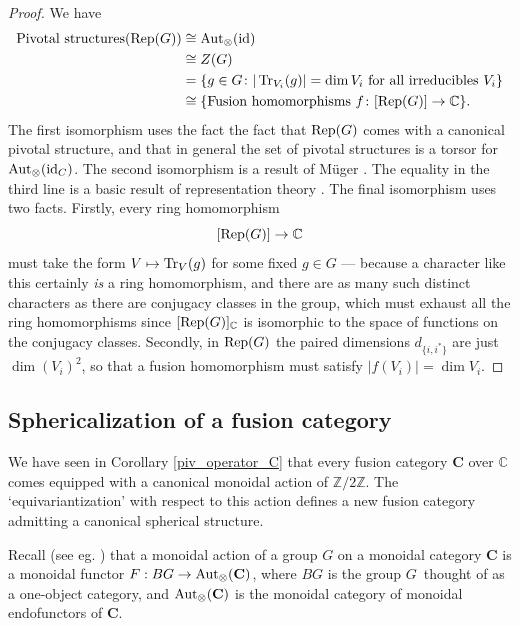 \documentclass[a4paper]{article}
\theoremstyle{plain}
\theoremstyle{definition}
\newcommand\id{\operatorname{\text{\rm id}}}
\newcommand{\Tr}{\operatorname{\text{\rm Tr}}}
\newcommand{\Rep}{\operatorname{\text{\rm Rep}}}
\newcommand{\Aut}{\operatorname{\text{\rm Aut}}}
\newcommand{\cat}{\mathbf}
\begin{document}
\begin{proof} We have
 \begin{align*}
  \text{Pivotal structures}(\Rep(G)) & \cong \Aut_\otimes(\id) \\
   & \cong Z(G) \\
   & = \{ g \in G \colon |\Tr_{V_i} (g) | = \dim V_i \text{ for all
irreducibles $V_i$}\} \\
   & \cong \{\text{Fusion homomorphisms } f \colon [\Rep(G)] \rightarrow
\mathbb{C} \}.
  \end{align*}
The first isomorphism uses the fact the fact that $\Rep(G)$ comes with a canonical pivotal structure, and that in general the set of pivotal structures is a torsor for $\Aut_\otimes (\id_C)$. The second isomorphism is a result
of M\"{u}ger \cite{muger2004center}. The equality in the third
line is a basic result of representation theory \cite[Cor 2.28]{isaacs1976-character}. The final isomorphism uses two facts. Firstly,
every ring homomorphism
 \[
  [\Rep(G)] \rightarrow \mathbb{C}
 \]
must take the form $V \mapsto \Tr_V(g)$ for some fixed $g \in G$ ---
because a character like this certainly {\em is} a ring homomorphism,
and there are as many such distinct characters as there are conjugacy
classes in the group, which must exhaust all the ring homomorphisms
since $[\Rep(G)]_\mathbb{C}$ is isomorphic to the space of functions
on the conjugacy classes. Secondly, in $\Rep(G)$ the paired dimensions
$d_{\{i,i^*\}}$ are just $\dim(V_i)^2$, so that a fusion homomorphism
must satisfy $| f(V_i) | = \dim V_i$.
\end{proof}


\subsection{Sphericalization of a fusion category}
We have seen in Corollary \ref{piv_operator_C}  that every fusion category $\cat{C}$ over $\mathbb{C}$ comes equipped with a canonical monoidal action of $\mathbb{Z} / 2 \mathbb{Z}$. The `equivariantization' with respect to this action defines a new fusion category admitting a canonical spherical structure. 

Recall (see eg. \cite{nikshych2008non}) that a monoidal action of a group $G$ on a monoidal category $\cat{C}$ is a monoidal functor $F : BG \rightarrow  \Aut_\otimes(\cat{C})$, where $BG$ is the group $G$\ thought of as a one-object category, and $\Aut_\otimes (\cat{C})$ is the monoidal category of monoidal endofunctors of $\cat{C}$. 
\end{document}

